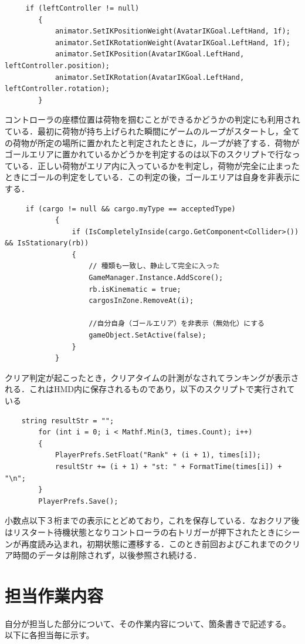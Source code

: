 \documentclass[12pt, xelatex,ja=standard,jafont=hiragino]{bxjsarticle}
\newif\ifdraft
\begin{document}
\begin{lstlisting}
     if (leftController != null)
        {
            animator.SetIKPositionWeight(AvatarIKGoal.LeftHand, 1f);
            animator.SetIKRotationWeight(AvatarIKGoal.LeftHand, 1f);
            animator.SetIKPosition(AvatarIKGoal.LeftHand, leftController.position);
            animator.SetIKRotation(AvatarIKGoal.LeftHand, leftController.rotation);
        }
\end{lstlisting}
コントローラの座標位置は荷物を掴むことができるかどうかの判定にも利用されている．最初に荷物が持ち上げられた瞬間にゲームのループがスタートし，全ての荷物が所定の場所に置かれたと判定されたときに，ループが終了する．荷物がゴールエリアに置かれているかどうかを判定するのは以下のスクリプトで行なっている．正しい荷物がエリア内に入っているかを判定し，荷物が完全に止まったときにゴールの判定をしている．この判定の後，ゴールエリアは自身を非表示にする．
\begin{lstlisting}
     if (cargo != null && cargo.myType == acceptedType)
            {
                if (IsCompletelyInside(cargo.GetComponent<Collider>()) && IsStationary(rb))
                {
                    // 種類も一致し、静止して完全に入った
                    GameManager.Instance.AddScore();
                    rb.isKinematic = true; 
                    cargosInZone.RemoveAt(i);

                    //自分自身（ゴールエリア）を非表示（無効化）にする
                    gameObject.SetActive(false);
                }
            }
\end{lstlisting}
クリア判定が起こったとき，クリアタイムの計測がなされてランキングが表示される．これはHMD内に保存されるものであり，以下のスクリプトで実行されている\begin{lstlisting}
    string resultStr = "";
        for (int i = 0; i < Mathf.Min(3, times.Count); i++)
        {
            PlayerPrefs.SetFloat("Rank" + (i + 1), times[i]);
            resultStr += (i + 1) + "st: " + FormatTime(times[i]) + "\n";
        }
        PlayerPrefs.Save();
\end{lstlisting}
小数点以下３桁までの表示にとどめており，これを保存している．なおクリア後はリスタート待機状態となりコントローラの右トリガーが押下されたときにシーンが再度読み込まれ，初期状態に遷移する．このとき前回およびこれまでのクリア時間のデータは削除されず，以後参照され続ける．


\section{担当作業内容}
\ifdraft
自分が担当した部分について、その作業内容について、箇条書きで記述する。
以下に各担当毎に示す。
\end{document}
